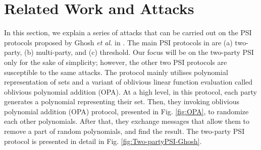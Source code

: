 




\section{Related Work and Attacks}\label{attacks}

In this section, we explain a series of attacks that can be carried out on the PSI protocols proposed by Ghosh \textit{et al.} in \cite{GhoshN19}. The main PSI protocols in  \cite{GhoshN19} are (a) two-party, (b) multi-party, and (c) threshold. Our  focus will be on the two-party PSI only for the sake of simplicity; however,  the other two  PSI protocols are susceptible to the same attacks. The protocol mainly utilises polynomial representation of sets and a variant of oblivious linear function evaluation \cite{ghosh2017maliciously} called oblivious polynomial addition (OPA). At a high level, in this protocol, each party generates a polynomial representing their set. Then, they  invoking oblivious polynomial addition (OPA) protocol, presented in Fig. \ref{fig:OPA}, to randomize each other polynomials. After that, they exchange messages that allow them to remove a part of random  polynomials, and find the result. The two-party PSI protocol is presented in detail in Fig. \ref{fig:Two-partyPSI-Ghosh}.





